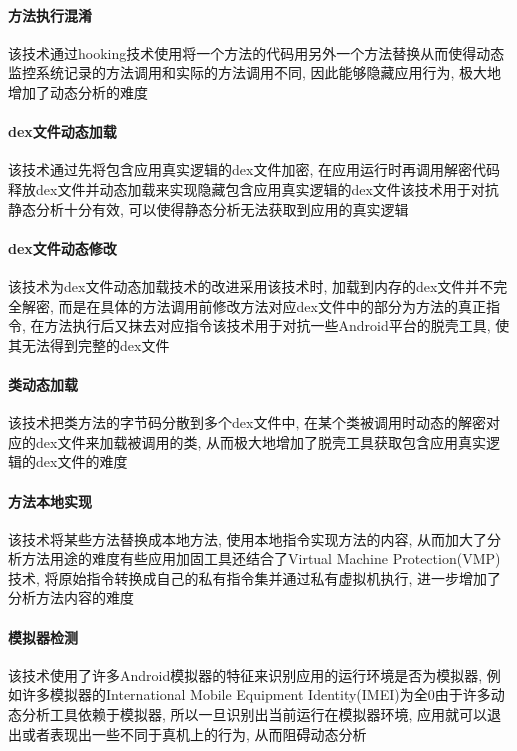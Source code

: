 \paragraph*{方法执行混淆}
该技术通过hooking技术使用将一个方法的代码用另外一个方法替换从而使得动态监控系统记录的方法调用和实际的方法调用不同, 因此能够隐藏应用行为, 极大地增加了动态分析的难度\juhao

\paragraph*{dex文件动态加载}
该技术通过先将包含应用真实逻辑的dex文件加密, 在应用运行时再调用解密代码释放dex文件并动态加载来实现隐藏包含应用真实逻辑的dex文件\juhao 该技术用于对抗静态分析十分有效, 可以使得静态分析无法获取到应用的真实逻辑\juhao

\paragraph*{dex文件动态修改}
该技术为dex文件动态加载技术的改进\juhao 采用该技术时, 加载到内存的dex文件并不完全解密, 而是在具体的方法调用前修改方法对应dex文件中的部分为方法的真正指令, 在方法执行后又抹去对应指令\juhao 该技术用于对抗一些Android平台的脱壳工具, 使其无法得到完整的dex文件\juhao

\paragraph*{类动态加载}
该技术把类方法的字节码分散到多个dex文件中, 在某个类被调用时动态的解密对应的dex文件来加载被调用的类, 从而极大地增加了脱壳工具获取包含应用真实逻辑的dex文件的难度\juhao

\paragraph*{方法本地实现}
该技术将某些方法替换成本地方法, 使用本地指令实现方法的内容, 从而加大了分析方法用途的难度\juhao 有些应用加固工具还结合了Virtual Machine Protection(VMP)技术, 将原始指令转换成自己的私有指令集并通过私有虚拟机执行, 进一步增加了分析方法内容的难度\juhao

\paragraph*{模拟器检测}
该技术使用了许多Android模拟器的特征来识别应用的运行环境是否为模拟器, 例如许多模拟器的International Mobile Equipment Identity(IMEI)为全0\juhao 由于许多动态分析工具依赖于模拟器, 所以一旦识别出当前运行在模拟器环境, 应用就可以退出或者表现出一些不同于真机上的行为, 从而阻碍动态分析\juhao

